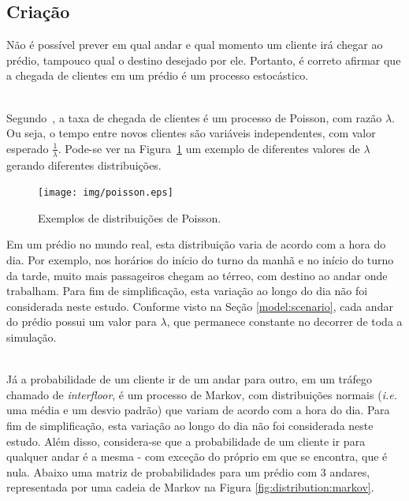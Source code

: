 \subsection{Criação} \label{model:event:creation}

Não é possível prever em qual andar e qual momento um cliente irá chegar ao
prédio, tampouco qual o destino desejado por ele. Portanto, é correto afirmar
que a chegada de clientes em um prédio é um processo estocástico.

\begin{description}\setlength\itemsep{0mm}

\item[Horário de chegada] \hfill \\
Segundo~\cite{Ross:2006:IPM:1197141}, a taxa de chegada de clientes é um
processo de Poisson, com razão $\lambda$. Ou seja, o tempo entre novos clientes
são variáveis independentes, com valor esperado $\frac{1}{\lambda}$. Pode-se ver
na Figura~\ref{fig:distribution:poisson} um exemplo de diferentes valores de
$\lambda$ gerando diferentes distribuições.

\begin{figure}[htb!]
  \centering
  \texttt{[image: img/poisson.eps]}
  \caption{Exemplos de distribuições de Poisson.}
\label{fig:distribution:poisson}
\end{figure}

Em um prédio no mundo real, esta distribuição varia de acordo com a hora do dia.
Por exemplo, nos horários do início do turno da manhã e no início do turno da
tarde, muito mais passageiros chegam ao térreo, com destino ao andar onde
trabalham. Para fim de simplificação, esta variação ao longo do dia não foi
considerada neste estudo. Conforme visto na Seção \ref{model:scenario}, cada
andar do prédio possui um valor para $\lambda$, que permanece constante no
decorrer de toda a simulação.

\item[Andar de destino] \hfill \\
Já a probabilidade de um cliente ir de um andar para outro, em um tráfego
chamado de \textit{interfloor}, é um processo de Markov, com distribuições
normais (\textit{i.e.} uma média e um desvio padrão) que variam de acordo com a
hora do dia. Para fim de simplificação, esta variação ao longo do dia não foi
considerada neste estudo. Além disso, considera-se que a probabilidade de um
cliente ir para qualquer andar é a mesma - com exceção do próprio em que se
encontra, que é nula. Abaixo uma matriz de probabilidades para um prédio com 3
andares, representada por uma cadeia de Markov na Figura
\ref{fig:distribution:markov}.


\end{description}
